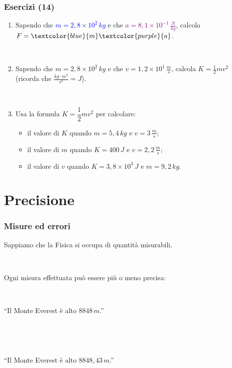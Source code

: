 \documentclass[]{beamer}
\begin{document}
\begin{frame}
\frametitle{Esercizi (14)}
\begin{enumerate}
  \item Sapendo che \textcolor{blue}{$ m = 2,8 \times 10^2 \, kg $} e che \textcolor{purple}{$ a = 8,1 \times 10^{-1} \, \frac{N}{kg} $}, calcola $ F = \textcolor{blue}{m}\textcolor{purple}{a} $.
  
  ~

  \item Sapendo che $ m = 2,8 \times 10^2 \, kg $ e che $ v = 1,2 \times 10^1 \, \frac{m}{s} $, calcola $ K = \frac{1}{2} mv^2 $ (ricorda che $ \frac{kg \cdot m^2}{s^2} = J $).
  
  ~

  \item Usa la formula $ K = \dfrac{1}{2}mv^2 $ per calcolare:
    \begin{itemize}
        \item il valore di $ K $ quando $ m= 5,4 \, kg $ e $ v = 3 \, \frac{m}{s} $;
        \item il valore di $ m $ quando $ K = 400 \, J $ e $ v = 2,2 \, \frac{m}{s} $;
        \item il valore di $ v $ quando $ K = 3,8 \times 10^3 \, J $ e $ m = 9,2 \, kg $.
    \end{itemize}
\end{enumerate}
\end{frame}





\section{Precisione}

\begin{frame}
\frametitle{Misure ed errori}
Sappiamo che la Fisica si occupa di \alert<1>{quantità misurabili}.\pause

~

Ogni misura effettuata può essere più o meno precisa:

~

\begin{center}
``Il Monte Everest è alto \alert{$ 8848 \, m $}.''

~

~

``Il Monte Everest è alto \alert{$ 8848,43 \, m $}.''
\end{center}
\end{frame}
\end{document}
